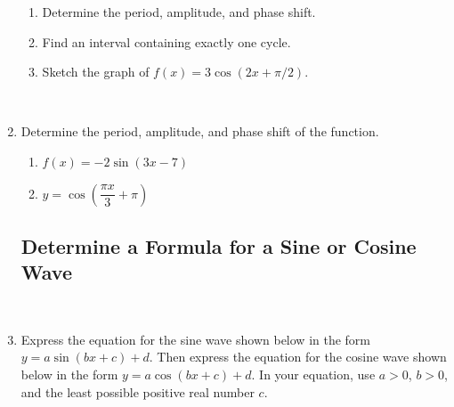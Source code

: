 \begin{enumerate}
\begin{enumerate}
\item Determine the period, amplitude, and phase shift.\\[1.5in]

\item Find an interval containing exactly one cycle.\vfill

\item Sketch the graph of $f(x)=3\cos(2x+\pi/2)$. 
\end{enumerate} 

\\[.5in]



\newpage



\item Determine the period, amplitude, and phase shift of the function. \begin{enumerate}
\item $f(x)= -2 \sin(3x-7)$ \\[1in] 
\item $y = \cos\left(\dfrac{\pi x}{3}+\pi\right)$ \\[1in]
\end{enumerate}


\subsection{Determine a Formula for a Sine or Cosine Wave} ~

\item Express the equation for the sine wave shown below in the form
  $y=a\sin(bx+c)+d$. Then express the equation for the cosine wave
  shown below in the form $y=a\cos(bx+c)+d$.  In your equation, use
  $a>0$, $b>0$, and the least possible positive real number $c$.




\end{enumerate}
